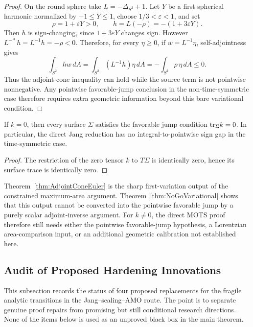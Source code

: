 \begin{proof}
On the round sphere take \(L=-\Delta_{S^2}+1\). Let \(Y\) be a first spherical harmonic normalized by \(-1\le Y\le1\), choose \(1/3<\varepsilon<1\), and set
\[
    \rho=1+\varepsilon Y>0,\qquad h=L(-\rho)=-(1+3\varepsilon Y).
\]
Then \(h\) is sign-changing, since \(1+3\varepsilon Y\) changes sign. However \(L^{-*}h=L^{-1}h=-\rho<0\). Therefore, for every \(\eta\ge0\), if \(w=L^{-1}\eta\), self-adjointness gives
\[
    \int_{S^2} h w\,dA = \int_{S^2} (L^{-1}h)\eta\,dA
    = -\int_{S^2}\rho\,\eta\,dA \le 0.
\]
Thus the adjoint-cone inequality can hold while the source term is not pointwise nonnegative. Any pointwise favorable-jump conclusion in the non-time-symmetric case therefore requires extra geometric information beyond this bare variational condition.
\end{proof}

\begin{theorem}\label{thm:IntegralToPointwise}
If \(k=0\), then every surface \(\Sigma\) satisfies the favorable jump condition \(\mathrm{tr}_\Sigma k=0\). In particular, the direct Jang reduction has no integral-to-pointwise sign gap in the time-symmetric case.
\end{theorem}

\begin{proof}
The restriction of the zero tensor \(k\) to \(T\Sigma\) is identically zero, hence its surface trace is identically zero.
\end{proof}

\begin{remark}\label{rem:PointwiseGapRemaining}
Theorem~\ref{thm:AdjointConeEuler} is the sharp first-variation output of the constrained maximum-area argument. Theorem~\ref{thm:NoGoVariational} shows that this output cannot be converted into the pointwise favorable jump by a purely scalar adjoint-inverse argument. For \(k\neq0\), the direct MOTS proof therefore still needs either the pointwise favorable-jump hypothesis, a Lorentzian area-comparison input, or an additional geometric calibration not established here.
\end{remark}

\subsection{Audit of Proposed Hardening Innovations}
\label{subsec:HardeningInnovationAudit}

This subsection records the status of four proposed replacements for the
fragile analytic transitions in the Jang--sealing--AMO route.  The point is to
separate genuine proof repairs from promising but still conditional research
directions.  None of the items below is used as an unproved black box in the
main theorem.

